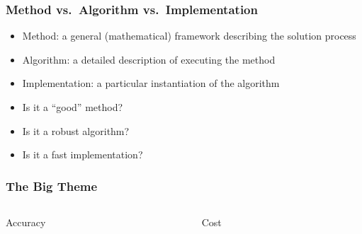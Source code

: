 \documentclass[10pt]{beamer}
\begin{document}
\begin{frame}
\frametitle{Method vs.~Algorithm vs.~Implementation}
\begin{itemize}
\item Method: a general (mathematical) framework describing the solution process
\item Algorithm: a detailed description of executing the method
\item Implementation: a particular instantiation of the algorithm
\end{itemize}
\begin{itemize}
\item Is it a ``good'' method?
\item Is it a robust algorithm?
\item Is it a fast implementation?
\end{itemize}
\end{frame}
\begin{frame}
\frametitle{The Big Theme}
\begin{columns}
\begin{column}{0.45\textwidth}

\begin{center}
  \begin{block}{}
    Accuracy
  \end{block}
\end{center}
\end{column}

\begin{column}{0.45\textwidth}

\begin{center}
  \begin{block}{}
    Cost
  \end{block}
\end{center}
\end{column}

\end{columns}
\end{frame}
\end{document}
